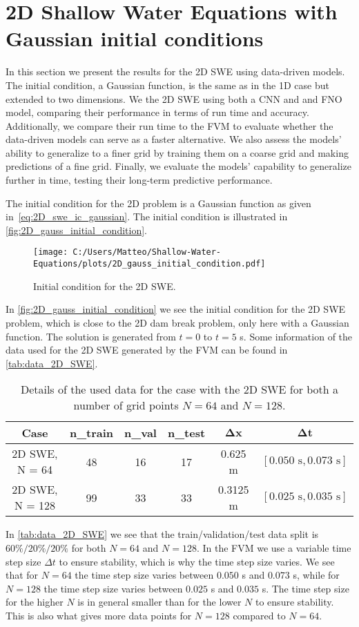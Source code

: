 \section{2D Shallow Water Equations with Gaussian initial conditions}\label{sec:data-driven-results-2D}
In this section we present the results for the 2D SWE using data-driven models. 
The initial condition, a Gaussian function, is the same as in the 1D case but extended to two dimensions.
We the 2D SWE using both a CNN and and FNO model, comparing their performance in terms of run time and accuracy.
Additionally, we compare their run time to the FVM to evaluate whether the data-driven models can serve as a faster alternative.
We also assess the models' ability to generalize to a finer grid by training them on a coarse grid and making predictions of a fine grid.
Finally, we evaluate the models' capability to generalize further in time, testing their long-term predictive performance.

The initial condition for the 2D problem is a Gaussian function as given in~\eqref{eq:2D_swe_ic_gaussian}.
The initial condition is illustrated in \autoref{fig:2D_gauss_initial_condition}.
\begin{figure}[H]
    \centering
    \texttt{[image: C:/Users/Matteo/Shallow-Water-Equations/plots/2D\_gauss\_initial\_condition.pdf]}
    \caption{Initial condition for the 2D SWE.}\label{fig:2D_gauss_initial_condition}
\end{figure}
In \autoref{fig:2D_gauss_initial_condition} we see the initial condition for the 2D SWE problem, which is close to the 2D dam break problem, only here with a Gaussian function.
The solution is generated from $t = 0$ to $t = 5$ s.
Some information of the data used for the 2D SWE generated by the FVM can be found in \autoref{tab:data_2D_SWE}.
\begin{table}[H]
    \centering
    \begin{tabular}{c|ccccc}
        \textbf{Case} & \textbf{n\_train} & \textbf{n\_val} & \textbf{n\_test} & $\mathbf{\Delta x}$ & $\mathbf{\Delta t}$ \\
        \hline
        2D SWE, N = 64 & 48 & 16 & 17 & 0.625 m  & $[0.050 \text{ s}, 0.073 \text{ s}]$ \\
        2D SWE, N = 128 & 99 & 33 & 33 & 0.3125 m  & $[0.025 \text{ s}, 0.035 \text{ s}]$ \\
    \end{tabular}
    \caption{Details of the used data for the case with the 2D SWE for both a number of grid points $N=64$ and $N=128$.}\label{tab:data_2D_SWE}
\end{table}
In \autoref{tab:data_2D_SWE} we see that the train/validation/test data split is $60\%/20\%/20\%$ for both $N = 64$ and $N = 128$.
In the FVM we use a variable time step size $\Delta t$ to ensure stability, which is why the time step size varies.
We see that for $N = 64$ the time step size varies between $0.050$ s and $0.073$ s, while for $N = 128$ the time step size varies between $0.025$ s and $0.035$ s.
The time step size for the higher $N$ is in general smaller than for the lower $N$ to ensure stability.
This is also what gives more data points for $N = 128$ compared to $N = 64$.



